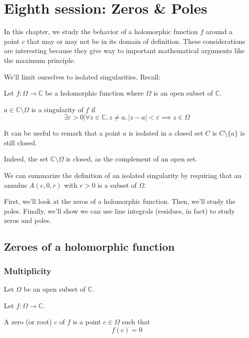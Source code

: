 \section{Eighth session: Zeros \& Poles}

In this chapter, we study the behavior of a holomorphic function $f$ around a point $c$ that may or may not be in its domain of definition. These considerations are interesting because they give way to important mathematical arguments like the maximum principle.

We'll limit ourselves to isolated singularities. Recall:
\begin{defi}
    Let $f: \Omega \rightarrow \mathbb{C}$ be a holomorphic function where $\Omega$ is an open subset of $\mathbb{C}$.
    
    $a\in\mathbb{C}\setminus\Omega$ is a singularity of $f$ if
    $$ \exists \varepsilon > 0 \vert \forall z\in\mathbb{C}, z \neq a, |z-a| < \varepsilon \implies z\in\Omega$$
\end{defi}

\begin{note}
    It can be useful to remark that a point $a$ is isolated in a closed set $C$ is $C\setminus \{a\}$ is still closed. 

    Indeed, the set $\mathbb{C}\setminus\Omega$ is closed, as the complement of an open set.
\end{note}

\begin{note}
    We can summarize the definition of an isolated singularity by requiring that an annulus $A(c, 0, r)$ with $r>0$ is a subset of $\Omega$.
\end{note}


First, we'll look at the zeros of a holomorphic function. Then, we'll study the poles. Finally, we'll show we can use line integrals (residues, in fact) to study zeros and poles.


\subsection{Zeroes of a holomorphic function}
\subsubsection{Multiplicity}
\begin{defi}
    [Zero]
    Let $\Omega$ be an open subset of $\mathbb{C}$.

    Let $f: \Omega \rightarrow \mathbb{C}$.

    A zero (or root) $c$ of $f$ is a point $c\in\Omega$ such that $$ f(c) = 0$$
\end{defi}

